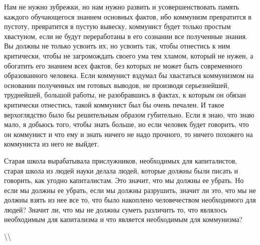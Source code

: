 \documentclass[12pt]{article}
\newcommand\ellipsis{%
  \textbackslash\thinspace\textellipsis\textbackslash
}
\newcommand{\parnum}{(\arabic{parcount})}
\newcounter{parcount}
\newenvironment{parnumbers}{%
  \par%
  \everypar{\noindent \stepcounter{parcount}\marginpar[]{\parnum}}%
}{}
\begin{document}
\begin{parnumbers}
Нам не нужно зубрежки, но нам нужно развить и усовершенствовать память каждого обучающегося знанием основных фактов, ибо коммунизм превратится в пустоту, превратится в пустую вывеску, коммунист будет только простым хвастуном, если не будут переработаны в его сознании все полученные знания. Вы должны не только усвоить их, но усвоить так, чтобы отнестись к ним критически, чтобы не загромождать своего ума тем хламом, который не нужен, а обогатить его знанием всех фактов, без которых не может быть современного образованного человека. Если коммунист вздумал бы хвастаться коммунизмом на основании полученных им готовых выводов, не производя серьезнейшей, труднейшей, большой работы, не разобравшись в фактах, к которым он обязан критически отнестись, такой коммунист был бы очень печален. И такое верхоглядство было бы решительным образом губительно. Если я знаю, что знаю мало, я добьюсь того, чтобы знать больше, но если человек будет говорить, что он коммунист и что ему и знать ничего не надо прочного, то ничего похожего на коммуниста из него не выйдет.

Старая школа вырабатывала прислужников, необходимых для капиталистов, старая школа из людей науки делала людей, которые должны были писать и говорить, как угодно капиталистам. Это значит, что мы должны ее убрать. Но если мы должны ее убрать, если мы должны разрушить, значит ли это, что мы не должны взять из нее все то, что было накоплено человечеством необходимого для людей? Значит ли, что мы не должны суметь различить то, что являлось необходимым для капитализма и что является необходимым для коммунизма?
\end{parnumbers}

\ellipsis
\end{document}
